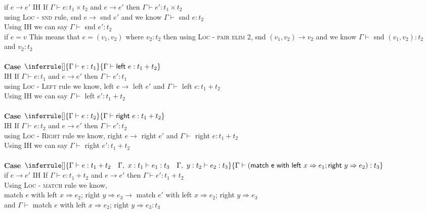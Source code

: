 \documentclass{article}
\begin{document}
if $e \to e'$
IH If $\Gamma \vdash e : t_1 \times t_2$ and  $e \to e'$ then $\Gamma \vdash e' : t_1 \times t_2$ \\
using \textsc{Loc - snd} rule, snd $e \to$ snd $e'$ and we know $\Gamma \vdash$ snd $e : t_2$ \\
Using IH we can say $\Gamma \vdash$ snd $ e' : t_2$ \\
if $e = v$ This means that $e = (v_1, v_2)$ where $v_2 : t_2$
then using \textsc{Loc - pair elim 2}, snd $(v_1, v_2) \to v_2$ and we know $\Gamma \vdash$ snd $(v_1, v_2) : t_2$ \\
and $v_2: t_2$\\\\
\textbf{Case $\inferrule []
{ \Gamma \vdash e : t_1 }
{ \Gamma \vdash \textsf{left} \ e : t_1 + t_2 }$ } \\
IH If $\Gamma \vdash e : t_1$ and  $e \to e'$ then $\Gamma \vdash e' : t_1$ \\
using \textsc{Loc - Left} rule we know, left $e \to$ left $e'$ and $\Gamma \vdash$ left $e : t_1+t_2$ \\
Using IH we can say $\Gamma \vdash$ left $ e' : t_1 + t_2$ \\\\
\textbf{Case $\inferrule []
{ \Gamma \vdash e : t_2 }
{ \Gamma \vdash \textsf{right} \ e : t_1 + t_2 }$ } \\
IH If $\Gamma \vdash e : t_2$ and  $e \to e'$ then $\Gamma \vdash e' : t_2$ \\
using \textsc{Loc - Right} rule we know, right $e \to$ right $e'$ and $\Gamma \vdash$ right $e : t_1+t_2$ \\
Using IH we can say $\Gamma \vdash$ right $ e' : t_1 + t_2$ \\\\
\textbf{Case $\inferrule []
{ \Gamma \vdash e : t_1+t_2 \quad \Gamma , \ x : t_1 \vdash e_1 : t_3 \quad \Gamma , \ y : t_2 \vdash e_2 : t_3  }
{ \Gamma \vdash (\textsf{match e with left} \ x \Rightarrow e_1 ; \textsf{right} \ y \Rightarrow e_2) :t_3  } $ } \\
if $e \to e'$
IH If $\Gamma \vdash e : t_1+t_2$ and  $e \to e'$ then $\Gamma \vdash e' : t_1+t_2$ \\
Using \textsc{Loc - match} rule we know, \\ 
match $e$ with left $x \Rightarrow e_2 $; right $ y \Rightarrow e_3 \to$
match $e'$ with left $x \Rightarrow e_2 $; right $ y \Rightarrow e_3$ \\ and $\Gamma \vdash$ match $e$ with left $x \Rightarrow e_2 $; right $ y \Rightarrow e_3 : t_3$ \\
\end{document}
